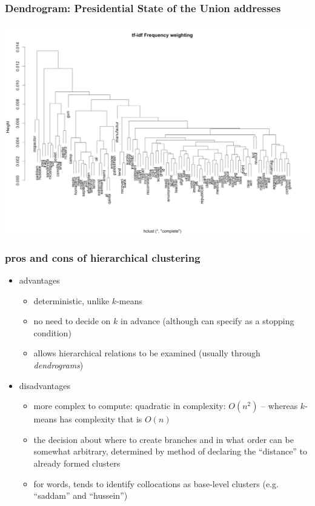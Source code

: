 \documentclass{beamer}
\begin{document}
\begin{frame}
	\frametitle{Dendrogram: Presidential State of the Union addresses}
	\hspace*{-1cm}
	\includegraphics[width=1.15\textwidth]{figures/dendrogram1.pdf}
\end{frame}

\begin{frame}
	\frametitle{pros and cons of hierarchical clustering}
	\begin{itemize}
		\item advantages
		\begin{itemize}
			\item deterministic, unlike $k$-means
			\item no need to decide on $k$ in advance (although can specify as
			a stopping condition)
			\item allows hierarchical relations to be examined \newline (usually
			through \emph{dendrograms})
		\end{itemize}
		\item \pause disadvantages
		\begin{itemize}
			\item more complex to compute: quadratic in complexity: $O(n^2)$
			\newline -- whereas $k$-means has complexity that is $O(n)$
			\item the decision about where to create branches and in what
			order can be somewhat arbitrary, determined by method of
			declaring the ``distance'' to already formed clusters
			\item for words, tends to identify collocations as base-level
			clusters (e.g. ``saddam'' and ``hussein'')
		\end{itemize}
	\end{itemize}
\end{frame}
\end{document}
